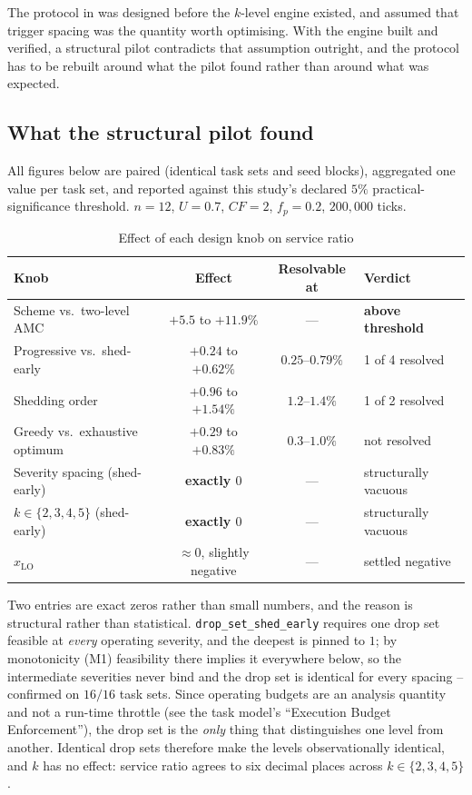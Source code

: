 \documentclass{article}
\begin{document}
The protocol in  was designed before
the $k$-level engine existed, and assumed that trigger spacing was the quantity
worth optimising. With the engine built and verified, a structural pilot
contradicts that assumption outright, and the protocol has to be rebuilt around
what the pilot found rather than around what was expected.

\subsection{What the structural pilot found}
\label{sec:structural-pilot}

All figures below are paired (identical task sets and seed blocks), aggregated
one value per task set, and reported against this study's declared $5\%$
practical-significance threshold. $n = 12$, $U = 0.7$, $CF = 2$, $f_p = 0.2$,
$200{,}000$ ticks.

\begin{table}[h]
\centering
\caption{Effect of each design knob on service ratio}
\label{tab:knobs}
\begin{tabular}{lccl}
\toprule
Knob & Effect & Resolvable at & Verdict \\
\midrule
Scheme vs.\ two-level AMC   & $+5.5$ to $+11.9\%$ & --- & \textbf{above threshold} \\
Progressive vs.\ shed-early & $+0.24$ to $+0.62\%$ & $0.25$--$0.79\%$ & 1 of 4 resolved \\
Shedding order              & $+0.96$ to $+1.54\%$ & $1.2$--$1.4\%$ & 1 of 2 resolved \\
Greedy vs.\ exhaustive optimum & $+0.29$ to $+0.83\%$ & $0.3$--$1.0\%$ & not resolved \\
Severity spacing (shed-early) & \textbf{exactly $0$} & --- & structurally vacuous \\
$k \in \{2,3,4,5\}$ (shed-early) & \textbf{exactly $0$} & --- & structurally vacuous \\
$x_{\mathrm{LO}}$             & $\approx 0$, slightly negative & --- & settled negative \\
\bottomrule
\end{tabular}
\end{table}

Two entries are exact zeros rather than small numbers, and the reason is
structural rather than statistical. \texttt{drop\_set\_shed\_early} requires one
drop set feasible at \emph{every} operating severity, and the deepest is pinned
to $1$; by monotonicity (M1) feasibility there implies it everywhere below, so
the intermediate severities never bind and the drop set is identical for every
spacing -- confirmed on $16/16$ task sets. Since operating budgets are an
analysis quantity and not a run-time throttle (see the task model's
``Execution Budget Enforcement''), the drop set is the \emph{only} thing that
distinguishes one level from another. Identical drop sets therefore make the levels observationally
identical, and $k$ has no effect: service ratio agrees to six decimal places
across $k \in \{2,3,4,5\}$.
\end{document}
